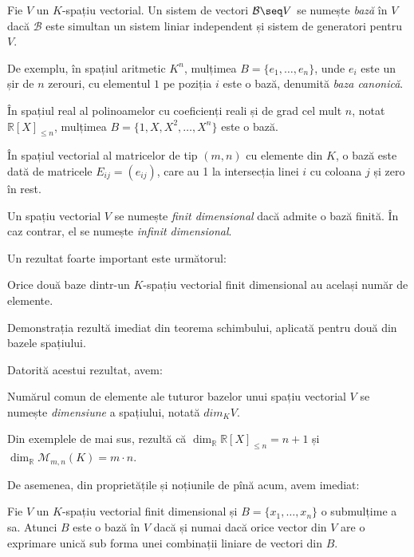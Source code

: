 \begin{definition} 
Fie $V$ un $K$-spațiu vectorial. Un sistem de vectori $\mathcal{B} \seq V$ 
se numește \emph{bază} în $V$ dacă $\mathcal{B}$ este simultan un sistem liniar 
independent și sistem de generatori pentru $V$.
\end{definition}

De exemplu, în spațiul aritmetic $K^n$, mulțimea $B = \{e_1, \dots, e_n\}$, 
unde $e_i$ este un șir de $n$ zerouri, cu elementul $1$ pe poziția $i$ este o 
bază, denumită \emph{baza canonică}. 

În spațiul real al polinoamelor cu coeficienți reali și de grad cel mult $n$, 
notat $\mathbb{R}[X]_{\leq n}$, mulțimea $B = \{1, X, X^2, \dots, X^n\}$ este 
o bază.

În spațiul vectorial al matricelor de tip $(m, n)$ cu elemente din $K$, o 
bază este dată de matricele $E_{ij} = (e_{ij})$, care au 1 la intersecția linei 
$i$ cu coloana $j$ și zero în rest.

\begin{definition}
Un spațiu vectorial $V$ se numește \emph{finit dimensional} dacă admite o bază 
finită. În caz contrar, el se numește \emph{infinit dimensional}.
\end{definition}

Un rezultat foarte important este următorul:
\begin{proposition}
Orice două baze dintr-un $K$-spațiu vectorial finit dimensional au același 
număr de elemente.
\end{proposition}

Demonstrația rezultă imediat din teorema schimbului, aplicată pentru două din 
bazele spațiului.

Datorită acestui rezultat, avem:
\begin{definition} 
Numărul comun de elemente ale tuturor bazelor unui spațiu vectorial $V$ se 
numește \emph{dimensiune} a spațiului, notată $dim_K V$.
\end{definition}

Din exemplele de mai sus, rezultă că 
$\dim_\mathbb{R} \mathbb{R}[X]_{\leq n} = n + 1$ și 
$\dim_\mathbb{R} \mathcal{M}_{m,n}(K) = m \cdot n$.

De asemenea, din proprietățile și noțiunile de pînă acum, avem imediat:
\begin{proposition}
Fie $V$ un $K$-spațiu vectorial finit dimensional și 
$B = \{x_1, \dots, x_n\}$ o submulțime a sa. Atunci $B$ este o bază în $V$ dacă 
și numai dacă orice vector din $V$ are o exprimare unică sub forma unei 
combinații liniare de vectori din $B$.
\end{proposition}

